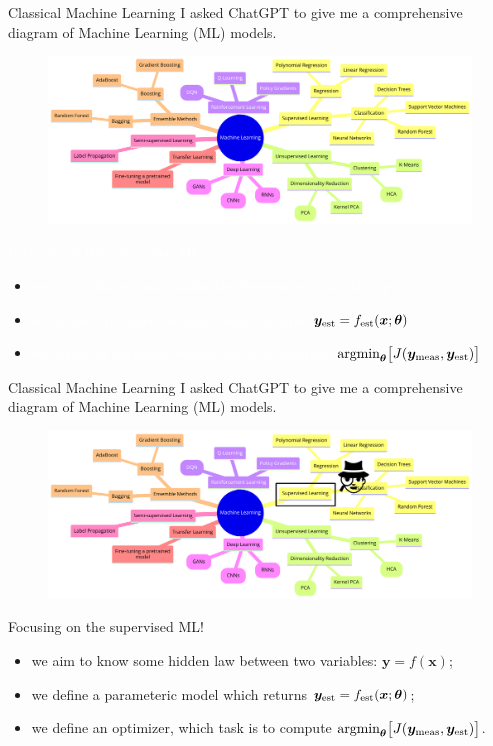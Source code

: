 \documentclass[8pt, xcolor={svgnames}, hyperref={linkcolor=amethyst}]{beamer}
\begin{document}
\begin{frame}{Classical Machine Learning}
\pause
I asked ChatGPT to give me a comprehensive diagram of Machine Learning (ML) models.
\begin{figure}
   \includegraphics[width=1\linewidth, height=0.5\textheight]{figures/ml.png}
\end{figure}  
\textcolor{white}{Focusing on the supervised ML:}
\begin{itemize}[noitemsep]
\item[] \textcolor{white}{we aim to know some hidden law between two variables: $\bm{y}=f(\bm{x})$}
\item[] \textcolor{white}{we define a parameteric model which returns $\bm{y}_{\rm est}=f_{\rm est}(\bm{x}; \bm{\theta})$}
\item[] \textcolor{white}{we define an optimizer, which task is to compute} 
   \textcolor{white}{$\text{argmin}_{\bm{\theta}}\bigl[J(\bm{y}_{\rm meas}, \bm{y}_{\rm est})\bigr]$}
\end{itemize}
\end{frame}

\begin{frame}{Classical Machine Learning}
I asked ChatGPT to give me a comprehensive diagram of Machine Learning (ML) models.
\begin{figure}
   \includegraphics[width=1\linewidth, height=0.5\textheight]{figures/supervised.png}
\end{figure}  
Focusing on the supervised ML!
\pause
\begin{itemize}[noitemsep]
\item[\faCrosshairs] we aim to know some hidden law between two variables: $\bm{y}=f(\bm{x})$;
\pause
\item[\faBarChart] we define a parameteric model which returns $\bm{y}_{\rm est}=f_{\rm est}(\bm{x}; \bm{\theta})$;
\pause
\item[\faBinoculars] we define an optimizer, which task is to compute 
   $\text{argmin}_{\bm{\theta}}\bigl[J(\bm{y}_{\rm meas}, \bm{y}_{\rm est})\bigr]$.
\end{itemize}
\end{frame}
\end{document}
